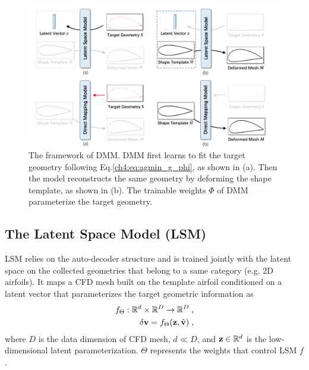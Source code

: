 \begin{figure}[th]
    \begin{center}
        \includegraphics[width=1\linewidth]{chapter4/fig/framework_DMM.pdf}
    \end{center}
    \caption{
        \small The framework of DMM. DMM first learns to fit the target geometry following Eq.\ref{ch4:eq:agmin_g_phi}, as shown in (a). Then the model reconstructs the same geometry by deforming the shape template, as shown in (b). The trainable weights $\Phi$ of DMM parameterize the target geometry.
    }
    \label{ch4:fig:framework_DMM}
\end{figure}

\subsection{The Latent Space Model (LSM)}
LSM relies on the auto-decoder structure \cite{ai.Tan1995,ai.Park2019c} and is trained jointly with the latent space on the collected geometries that belong to a same category (e.g. 2D airfoils). It maps a CFD mesh built on the template airfoil conditioned on a latent vector that parameterizes the target geometric information as
\begin{align}
    f_{\Theta} : \mathbb{R}^d \times \mathbb{R}^D \rightarrow \mathbb{R}^D \; , \label{ch4:eq:map_lsm} \\
    \mathbf{\delta v} = f_{\Theta}(\mathbf{z}, \hat{\mathbf{v}}) \; , \nonumber
\end{align} 
where $D$ is the data dimension of CFD mesh, $d \ll D$, and $\mathbf{z}\in \mathbb{R}^d$ is the low-dimensional latent parameterization. $\Theta$ represents the weights that control LSM $f$. 

